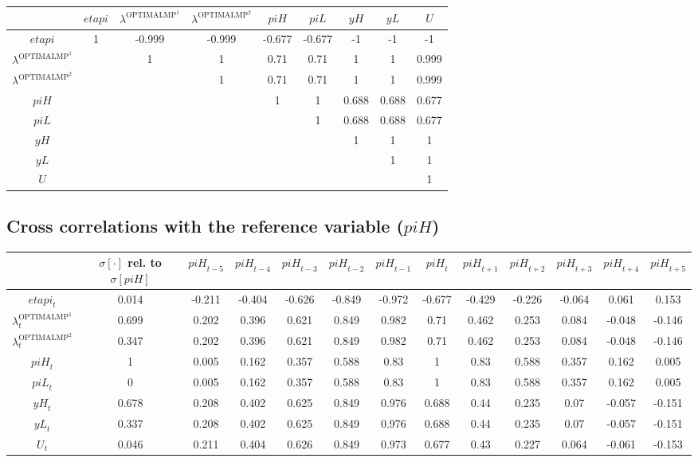 \begin{tabular}{c|cccccccc|}
  & ${e\!t\!a\!p\!i}$ & $\lambda^{\mathrm{OPTIMALMP}^{\mathrm{1}}}$ & $\lambda^{\mathrm{OPTIMALMP}^{\mathrm{2}}}$ & ${p\!i\!H}$ & ${p\!i\!L}$ & ${y\!H}$ & ${y\!L}$ & $U$\\
\hline
${e\!t\!a\!p\!i}$ & 1 & -0.999 & -0.999 & -0.677 & -0.677 & -1 & -1 & -1 \\
$\lambda^{\mathrm{OPTIMALMP}^{\mathrm{1}}}$ &  & 1 & 1 & 0.71 & 0.71 & 1 & 1 & 0.999 \\
$\lambda^{\mathrm{OPTIMALMP}^{\mathrm{2}}}$ &  &  & 1 & 0.71 & 0.71 & 1 & 1 & 0.999 \\
${p\!i\!H}$ &  &  &  & 1 & 1 & 0.688 & 0.688 & 0.677 \\
${p\!i\!L}$ &  &  &  &  & 1 & 0.688 & 0.688 & 0.677 \\
${y\!H}$ &  &  &  &  &  & 1 & 1 & 1 \\
${y\!L}$ &  &  &  &  &  &  & 1 & 1 \\
$U$ &  &  &  &  &  &  &  & 1 \\
\hline
\end{tabular}


\subsection{Cross correlations with the reference variable (${p\!i\!H}$)}

\begin{tabular}{c|c|c|c|c|c|c|c|c|c|c|c|c|}
  & $\sigma[\cdot]$ rel. to $\sigma[{p\!i\!H}]$ & ${p\!i\!H}_{t-5}$ & ${p\!i\!H}_{t-4}$ & ${p\!i\!H}_{t-3}$ & ${p\!i\!H}_{t-2}$ & ${p\!i\!H}_{t-1}$ & ${p\!i\!H}_{t}$ & ${p\!i\!H}_{t+1}$ & ${p\!i\!H}_{t+2}$ & ${p\!i\!H}_{t+3}$ & ${p\!i\!H}_{t+4}$ & ${p\!i\!H}_{t+5}$\\
\hline
${e\!t\!a\!p\!i}_{t}$ & 0.014 & -0.211 & -0.404 & -0.626 & -0.849 & -0.972 & -0.677 & -0.429 & -0.226 & -0.064 & 0.061 & 0.153 \\
$\lambda^{\mathrm{OPTIMALMP}^{\mathrm{1}}}_{t}$ & 0.699 & 0.202 & 0.396 & 0.621 & 0.849 & 0.982 & 0.71 & 0.462 & 0.253 & 0.084 & -0.048 & -0.146 \\
$\lambda^{\mathrm{OPTIMALMP}^{\mathrm{2}}}_{t}$ & 0.347 & 0.202 & 0.396 & 0.621 & 0.849 & 0.982 & 0.71 & 0.462 & 0.253 & 0.084 & -0.048 & -0.146 \\
${p\!i\!H}_{t}$ & 1 & 0.005 & 0.162 & 0.357 & 0.588 & 0.83 & 1 & 0.83 & 0.588 & 0.357 & 0.162 & 0.005 \\
${p\!i\!L}_{t}$ & 0 & 0.005 & 0.162 & 0.357 & 0.588 & 0.83 & 1 & 0.83 & 0.588 & 0.357 & 0.162 & 0.005 \\
${y\!H}_{t}$ & 0.678 & 0.208 & 0.402 & 0.625 & 0.849 & 0.976 & 0.688 & 0.44 & 0.235 & 0.07 & -0.057 & -0.151 \\
${y\!L}_{t}$ & 0.337 & 0.208 & 0.402 & 0.625 & 0.849 & 0.976 & 0.688 & 0.44 & 0.235 & 0.07 & -0.057 & -0.151 \\
$U_{t}$ & 0.046 & 0.211 & 0.404 & 0.626 & 0.849 & 0.973 & 0.677 & 0.43 & 0.227 & 0.064 & -0.061 & -0.153 \\
\hline
\end{tabular}


